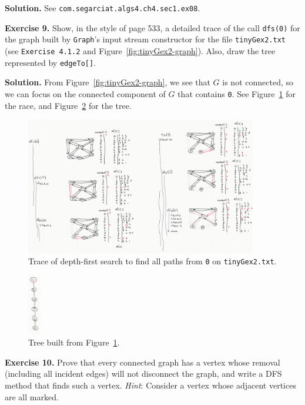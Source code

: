 \documentclass[12pt, a4paper]{article}
\newenvironment{ex}[2][Exercise]
{\par\medskip\noindent \textbf{#1 #2.}}
{\medskip}
\newenvironment{sol}[1][Solution]
{\par\medskip\noindent \textbf{#1.} }
{\medskip}
\begin{document}
	\begin{sol}
		See \texttt{com.segarciat.algs4.ch4.sec1.ex08}.
	\end{sol}
	\begin{ex}{9}
		Show, in the style of page 533, a detailed trace of the call \texttt{dfs(0)}
		for the graph built by \texttt{Graph}'s input stream constructor for the file
		\texttt{tinyGex2.txt} (see \texttt{Exercise 4.1.2} and Figure~\ref{fig:tinyGex2-graph}).
		Also, draw the tree represented by \texttt{edgeTo[]}.
	\end{ex}
	\begin{sol}
		From Figure~\ref{fig:tinyGex2-graph}, we see that $G$ is not connected, so
		we can focus on the connected component of $G$ that contains \texttt{0}.
		See Figure~\ref{fig:ex-09-dfs} for the race, and Figure~\ref{fig:ex-09-tree}
		for the tree.
		\begin{figure}
			\centering
			\includegraphics[width=0.9\textwidth]{exercise-09-dfs}
			\caption{Trace of depth-first search to find all paths from \texttt{0} on \texttt{tinyGex2.txt}.}
			\label{fig:ex-09-dfs}
		\end{figure}
		\begin{figure}
			\centering
			\includegraphics[width=0.05\textwidth]{exercise-09-edgeTo-tree}
			\caption{Tree built from Figure~\ref{fig:ex-09-dfs}.}
			\label{fig:ex-09-tree}
			\end{figure}
	\end{sol}
	\begin{ex}{10}
		Prove that every connected graph has a vertex whose removal (including all
		incident edges) will not disconnect the graph, and write a DFS method that
		finds such a vertex. \emph{Hint}: Consider a vertex whose adjacent vertices
		are all marked.
	\end{ex}
\end{document}
